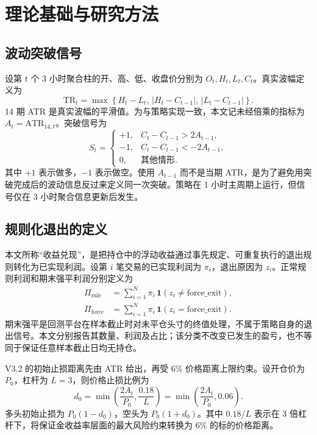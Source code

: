 \section{理论基础与研究方法}

\subsection{波动突破信号}

设第 $t$ 个 3 小时聚合柱的开、高、低、收盘价分别为 $O_t,H_t,L_t,C_t$。真实波幅定义为\cite{wilder1978}
\begin{equation}
  \mathrm{TR}_t=\max\left\{H_t-L_t,\,|H_t-C_{t-1}|,\,|L_t-C_{t-1}|\right\}.
  \label{eq:true-range}
\end{equation}
14 期 ATR 是真实波幅的平滑值。为与策略实现一致，本文记未经倍乘的指标为 $A_t=\mathrm{ATR}_{14,t}$。突破信号为
\begin{equation}
  S_t=
  \begin{cases}
    +1, & C_t-C_{t-1}>2A_{t-1},\\
    -1, & C_t-C_{t-1}<-2A_{t-1},\\
    0,  & \text{其他情形}.
  \end{cases}
  \label{eq:signal}
\end{equation}
其中 $+1$ 表示做多，$-1$ 表示做空。使用 $A_{t-1}$ 而不是当期 ATR，是为了避免用突破完成后的波动信息反过来定义同一次突破。策略在 1 小时主周期上运行，但信号仅在 3 小时聚合信息更新后发生。

\subsection{规则化退出的定义}

本文所称“收益兑现”，是把持仓中的浮动收益通过事先规定、可重复执行的退出规则转化为已实现利润。设第 $i$ 笔交易的已实现利润为 $\pi_i$，退出原因为 $z_i$。正常规则利润和期末强平利润分别定义为
\begin{align}
  \Pi_{\mathrm{rule}} &= \sum_{i=1}^{N}\pi_i\,\mathbf{1}(z_i\neq \text{force\_exit}), \\
  \Pi_{\mathrm{force}} &= \sum_{i=1}^{N}\pi_i\,\mathbf{1}(z_i=\text{force\_exit}).
  \label{eq:realized-profit}
\end{align}
期末强平是回测平台在样本截止时对未平仓头寸的终值处理，不属于策略自身的退出信号。本文分别报告其数量、利润及占比；该分类不改变已发生的盈亏，也不等同于保证任意样本截止日均无持仓。

V3.2 的初始止损距离先由 ATR 给出，再受 6\% 价格距离上限约束。设开仓价为 $P_0$，杠杆为 $L=3$，则价格止损比例为
\begin{equation}
  d_0=\min\left(\frac{2A_t}{P_0},\frac{0.18}{L}\right)
      =\min\left(\frac{2A_t}{P_0},0.06\right).
  \label{eq:initial-distance}
\end{equation}
多头初始止损为 $P_0(1-d_0)$，空头为 $P_0(1+d_0)$。其中 $0.18/L$ 表示在 3 倍杠杆下，将保证金收益率层面的最大风险约束转换为 6\% 的标的价格距离。

